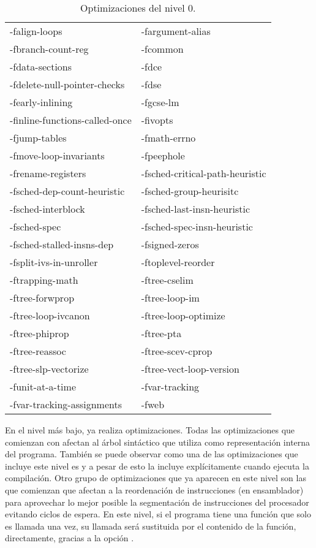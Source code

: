 \begin{table}[H]
\begin{center}
	\begin{tabular}{|ll|}
		\hline
		-falign-loops & -fargument-alias\\
		-fbranch-count-reg & -fcommon\\
		-fdata-sections & -fdce\\
		-fdelete-null-pointer-checks & -fdse\\
		-fearly-inlining & -fgcse-lm\\
		-finline-functions-called-once & -fivopts\\
		-fjump-tables & -fmath-errno\\
		-fmove-loop-invariants & -fpeephole\\
		-frename-registers & -fsched-critical-path-heuristic\\
		-fsched-dep-count-heuristic & -fsched-group-heurisitc\\
		-fsched-interblock & -fsched-last-insn-heuristic\\
		-fsched-spec & -fsched-spec-insn-heuristic\\
		-fsched-stalled-insns-dep & -fsigned-zeros\\
		-fsplit-ivs-in-unroller & -ftoplevel-reorder\\
		-ftrapping-math & -ftree-cselim\\
		-ftree-forwprop & -ftree-loop-im\\
		-ftree-loop-ivcanon & -ftree-loop-optimize\\
		-ftree-phiprop & -ftree-pta\\
		-ftree-reassoc & -ftree-scev-cprop\\
		-ftree-slp-vectorize & -ftree-vect-loop-version\\
		-funit-at-a-time & -fvar-tracking\\
		-fvar-tracking-assignments & -fweb\\
		\hline
	\end{tabular}
\end{center}
\caption{Optimizaciones del nivel 0.}
\label{opt0}
\end{table}

En el nivel más bajo,  ya realiza optimizaciones. Todas las optimizaciones que comienzan con  afectan al árbol sintáctico que utiliza  como representación interna del programa. También se puede observar como una de las optimizaciones que incluye este nivel es  y a pesar de esto  la incluye explícitamente cuando ejecuta la compilación. Otro grupo de optimizaciones que ya aparecen en este nivel son las que comienzan  que afectan a la reordenación de instrucciones (en ensamblador) para aprovechar lo mejor posible la segmentación de instrucciones del procesador evitando ciclos de espera. En este nivel, si el programa tiene una función que solo es llamada una vez, su llamada será sustituida por el contenido de la función, directamente, gracias a la opción .

